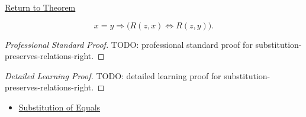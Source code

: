 \newpage
{}
\label{prf:substitution-preserves-relations-right}

\begin{remark*}[Return]
\hyperref[prop:substitution-preserves-relations-right]{Return to Theorem}
\end{remark*}

\begin{proposition*}
\[
x=y \Longrightarrow \bigl(R(z,x)\Longleftrightarrow R(z,y)\bigr).
\]
\end{proposition*}

\begin{proof}[Professional Standard Proof]
\LRAProofBodyStart
TODO: professional standard proof for substitution-preserves-relations-right.
\end{proof}

\begin{proof}[Detailed Learning Proof]
\LRAProofBodyStart
TODO: detailed learning proof for substitution-preserves-relations-right.
\end{proof}

\begin{remark*}
\end{remark*}

\begin{dependencies}
\begin{itemize}
  \item \hyperref[ax:equality-substitution]{Substitution of Equals}
\end{itemize}
\end{dependencies}

\clearpage
